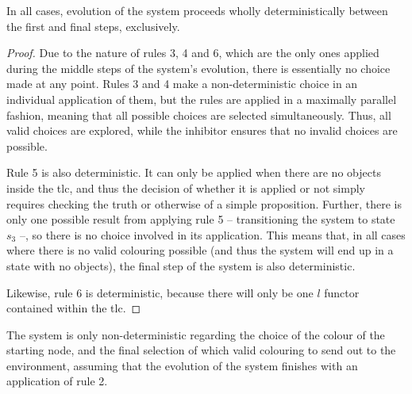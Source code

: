 \begin{proposition}\label{prop:gcol:determin}
In all cases, evolution of the system proceeds wholly deterministically between the first and final steps, exclusively.
\end{proposition}

\begin{proof}
Due to the nature of rules 3, 4 and 6, which are the only ones applied during the middle steps of the system's evolution, there is essentially no choice made at any point.  Rules 3 and 4 make a non-deterministic choice in an individual application of them, but the rules are applied in a maximally parallel fashion, meaning that all possible choices are selected simultaneously.  Thus, all valid choices are explored, while the inhibitor ensures that no invalid choices are possible.

Rule 5 is also deterministic.  It can only be applied when there are no \bo{} objects inside the \gls{tlc}, and thus the decision of whether it is applied or not simply requires checking the truth or otherwise of a simple proposition.  Further, there is only one possible result from applying rule 5 -- transitioning the system to state \(s_3\) --, so there is no choice involved in its application.  This means that, in all cases where there is no valid colouring possible (and thus the system will end up in a state with no \bo{} objects), the final step of the system is also deterministic.

Likewise, rule 6 is deterministic, because there will only be one \(l\) functor contained within the \gls{tlc}.
\end{proof}

\begin{proposition}\label{prop:gcol:nondet}
The system is only non-deterministic regarding the choice of the colour of the starting node, and the final selection of which valid colouring to send out to the environment, assuming that the evolution of the system finishes with an application of rule 2.
\end{proposition}

